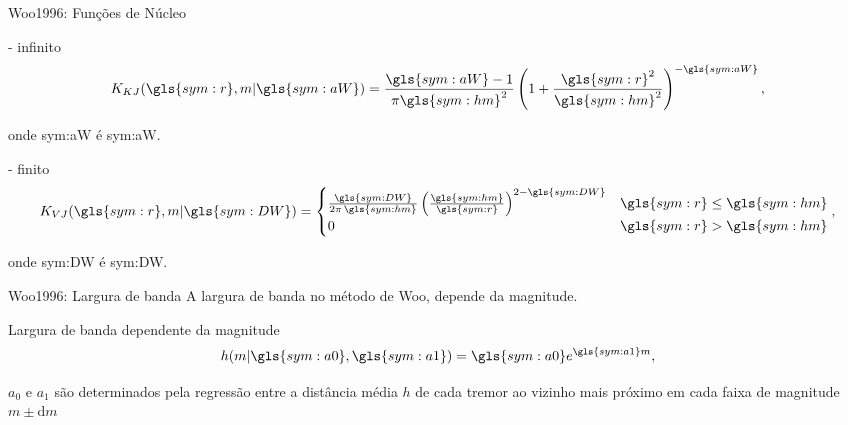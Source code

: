\documentclass[ucs,8pt]{beamer}
\begin{document}
\begin{frame}{Woo1996: Funções de Núcleo}
	\begin{block}{\citet{kagan_knopoff_1980} - infinito}
		\begin{equation}
			\ensuremath{
				K_{KJ}(\gls{sym:r}, m \arrowvert \gls{sym:aW}) =  \frac{  \gls{sym:aW}  -1}{\pi\gls{sym:hm}^2}
									\left( 1 + \frac{\gls{sym:r}^2}{\gls{sym:hm}^2} \right)^{-\gls{sym:aW}},
			}
			\label{eq:k_kj}
		\end{equation}
	\end{block}
	onde \gls{sym:aW} é \glsdesc{sym:aW}.

	\begin{block}{\citet{verejones_1992} - finito}
		\begin{equation}
			\ensuremath{
				K_{VJ}(\gls{sym:r}, m \arrowvert \gls{sym:DW}) = 
				\begin{cases}
					\frac{\gls{sym:DW}}{2\pi\,\gls{sym:hm}} 
					\left( \frac{\gls{sym:hm}}{\gls{sym:r}} \right)^{2 - \gls{sym:DW}} 
					  & \gls{sym:r} \leq \gls{sym:hm} \\
					0 & \gls{sym:r} > \gls{sym:hm}
				\end{cases},
			}
			\label{eq:k_vj}
		\end{equation}
	\end{block}
	onde \gls{sym:DW} é \glsdesc{sym:DW}.
\end{frame}



\begin{frame}{Woo1996: Largura de banda}
A largura de banda no método de Woo, \alert{depende da magnitude}.
\begin{block}{Largura de banda dependente da magnitude}
	\begin{equation}
		\ensuremath{
			h(m\arrowvert \gls{sym:a0}, \gls{sym:a1}) = \gls{sym:a0}e^{\gls{sym:a1}m},
		}
		\label{eq:hm}
	\end{equation}
\end{block}
$a_0$ e $a_1$ são determinados pela regressão entre a 
distância média $h$ de cada tremor ao vizinho mais próximo em cada faixa de magnitude $m \pm \mathrm{d}m$
\end{frame}
\end{document}
